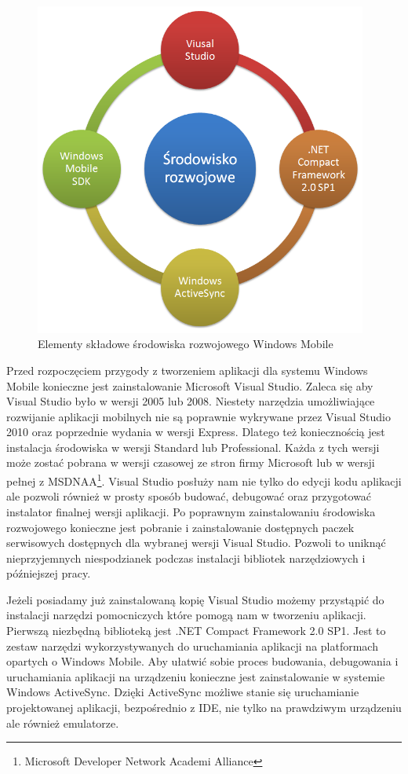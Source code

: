 \begin{figure}[h!]
 \centering
 \includegraphics[height=110mm]{../images/ch03/wm_dev_env.png}
 \caption{Elementy składowe środowiska rozwojowego Windows Mobile}
 \label{fig:WMDevelopmentEnviroment}
\end{figure}

Przed rozpoczęciem przygody z tworzeniem aplikacji dla systemu Windows Mobile
konieczne jest zainstalowanie Microsoft Visual Studio. Zaleca się aby Visual
Studio było w wersji 2005 lub 2008. Niestety narzędzia umożliwiające rozwijanie
aplikacji mobilnych nie są poprawnie wykrywane przez Visual Studio 2010 oraz
poprzednie wydania w wersji Express. Dlatego też koniecznością jest instalacja
środowiska w wersji Standard lub Professional. Każda z tych wersji może zostać
pobrana w wersji czasowej ze stron firmy Microsoft lub w wersji pełnej z
MSDNAA\footnote{Microsoft Developer Network Academi Alliance}. Visual
Studio posłuży nam nie tylko do edycji kodu aplikacji ale pozwoli również w
prosty sposób budować, debugować oraz przygotować instalator finalnej wersji
aplikacji. Po poprawnym zainstalowaniu środowiska rozwojowego konieczne jest
pobranie i zainstalowanie dostępnych paczek serwisowych dostępnych dla wybranej
wersji Visual Studio. Pozwoli to uniknąć nieprzyjemnych niespodzianek podczas
instalacji bibliotek narzędziowych i późniejszej pracy.

Jeżeli posiadamy już zainstalowaną kopię Visual Studio możemy przystąpić do
instalacji narzędzi pomocniczych które pomogą nam w tworzeniu aplikacji.
Pierwszą niezbędną biblioteką jest .NET Compact Framework 2.0 SP1. Jest to
zestaw narzędzi wykorzystywanych do uruchamiania aplikacji na platformach
opartych o Windows Mobile. Aby ułatwić sobie proces budowania, debugowania i
uruchamiania aplikacji na urządzeniu konieczne jest zainstalowanie w systemie
Windows ActiveSync. Dzięki ActiveSync możliwe stanie się uruchamianie
projektowanej aplikacji, bezpośrednio z IDE, nie tylko na prawdziwym urządzeniu
ale również emulatorze. 

